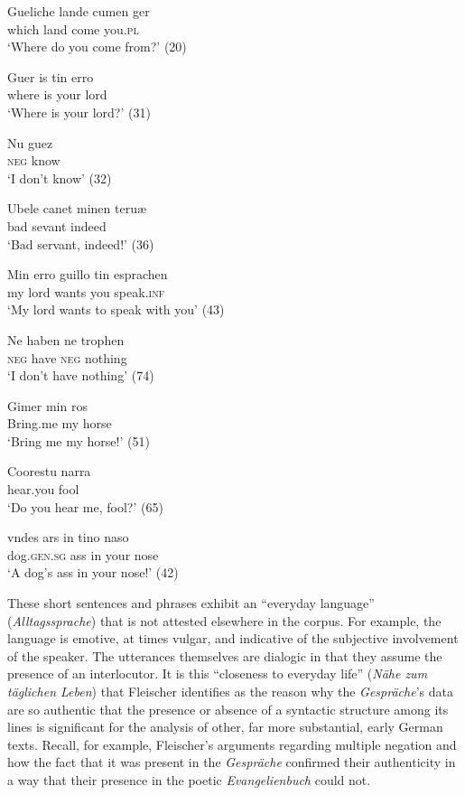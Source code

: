 \ea%
    \label{ex:2:10}
\ea
\gll Gueliche   lande  cumen  ger\\
 which  land   come  you.\textsc{pl}\\
\glt ‘Where do you come from?’ (20)

\ex
\gll Guer    is  tin     erro\\
 where  is   your  lord\\
\glt ‘Where is your lord?’ (31)

\ex
\gll Nu   guez\\
 \textsc{neg}   know\\
\glt ‘I don’t know’ (32)

\ex
\gll Ubele     canet    minen teruæ\\
 bad     sevant    indeed\\
\glt ‘Bad servant, indeed!’ (36)

\ex
\gll Min  erro    guillo   tin   esprachen\\
 my   lord    wants  you   speak.\textsc{inf}\\
\glt ‘My lord wants to speak with you’ (43)

\ex
\gll Ne  haben   ne trophen\\
 \textsc{neg}   have  \textsc{neg} nothing\\
\glt ‘I don’t have nothing’ (74)

\ex
\gll Gimer    min   ros\\
 Bring.me   my   horse\\
\glt ‘Bring me my horse!’ (51)

\ex
\gll Coorestu  narra\\
 hear.you   fool\\
\glt ‘Do you hear me, fool?’ (65)

\ex
\gll vndes     ars  in  tino   naso\\
 dog.\textsc{gen.sg}   ass  in   your  nose\\
\glt ‘A dog’s ass in your nose!’ (42)
    \z
\z

\noindent These short sentences and phrases exhibit an “everyday language” (\textit{Alltagssprache}) that is not attested elsewhere in the corpus. For example, the language is emotive, at times vulgar, and indicative of the subjective involvement of the speaker. The utterances themselves are dialogic in that they assume the presence of an interlocutor. It is this “closeness to everyday life” (\textit{Nähe zum täglichen Leben}) that Fleischer identifies as the reason why the \textit{Gespräche}’s data are so authentic that the presence or absence of a syntactic structure among its lines is significant for the analysis of other, far more substantial, early German texts. Recall, for example, Fleischer’s arguments regarding multiple negation and how the fact that it was present in the \textit{Gespräche} confirmed their authenticity in a way that their presence in the poetic \textit{Evangelienbuch} could not.

